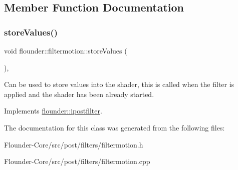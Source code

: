 \subsection{Member Function Documentation}
\mbox{\label{classflounder_1_1filtermotion_a6e8b5a9ce3660ab57fbb487fe6752acb}} 
\subsubsection{\texorpdfstring{store\+Values()}{storeValues()}}
{\footnotesize\ttfamily void flounder\+::filtermotion\+::store\+Values (\begin{DoxyParamCaption}{ }\end{DoxyParamCaption})\hspace{0.3cm}{\ttfamily [override]}, {\ttfamily [virtual]}}



Can be used to store values into the shader, this is called when the filter is applied and the shader has been already started. 



Implements \hyperlink{classflounder_1_1ipostfilter_a9b658b4672718d5ac36539875bde722e}{flounder\+::ipostfilter}.



The documentation for this class was generated from the following files\+:\begin{DoxyCompactItemize}
\item 
Flounder-\/\+Core/src/post/filters/filtermotion.\+h\item 
Flounder-\/\+Core/src/post/filters/filtermotion.\+cpp\end{DoxyCompactItemize}
